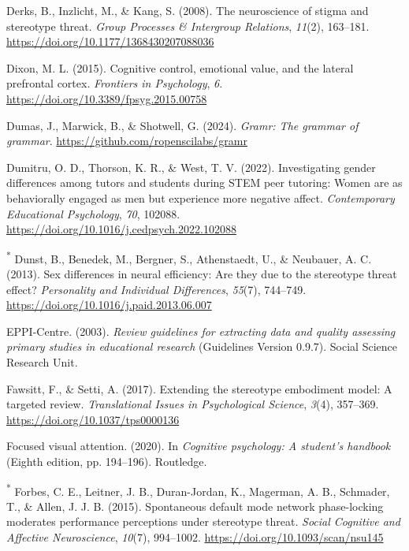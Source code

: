 \documentclass[
  stu, a4paper, 12pt,mask,floatsintext]{apa7}
\newlength{\cslhangindent}
\newenvironment{CSLReferences}[2] %
 {\begin{list}{}{%
  \setlength{\itemindent}{0pt}
  \setlength{\leftmargin}{0pt}
  \setlength{\parsep}{0pt}
  \ifodd #1
   \setlength{\leftmargin}{\cslhangindent}
   \setlength{\itemindent}{-1\cslhangindent}
  \fi
  \setlength{\itemsep}{#2\baselineskip}}}
 {\end{list}}
\begin{document}
\begin{CSLReferences}{1}{0}
Derks, B., Inzlicht, M., \& Kang, S. (2008). The neuroscience of stigma and stereotype threat. \emph{Group Processes \& Intergroup Relations}, \emph{11}(2), 163--181. \url{https://doi.org/10.1177/1368430207088036}

Dixon, M. L. (2015). Cognitive control, emotional value, and the lateral prefrontal cortex. \emph{Frontiers in Psychology}, \emph{6}. \url{https://doi.org/10.3389/fpsyg.2015.00758}

Dumas, J., Marwick, B., \& Shotwell, G. (2024). \emph{Gramr: The grammar of grammar}. \url{https://github.com/ropenscilabs/gramr}

Dumitru, O. D., Thorson, K. R., \& West, T. V. (2022). Investigating gender differences among tutors and students during {STEM} peer tutoring: {Women} are as behaviorally engaged as men but experience more negative affect. \emph{Contemporary Educational Psychology}, \emph{70}, 102088. \url{https://doi.org/10.1016/j.cedpsych.2022.102088}

\textsuperscript{*} Dunst, B., Benedek, M., Bergner, S., Athenstaedt, U., \& Neubauer, A. C. (2013). Sex differences in neural efficiency: {Are} they due to the stereotype threat effect? \emph{Personality and Individual Differences}, \emph{55}(7), 744--749. \url{https://doi.org/10.1016/j.paid.2013.06.007}

EPPI-Centre. (2003). \emph{Review guidelines for extracting data and quality assessing primary studies in educational research} (Guidelines Version 0.9.7). Social Science Research Unit.

Fawsitt, F., \& Setti, A. (2017). Extending the stereotype embodiment model: A targeted review. \emph{Translational Issues in Psychological Science}, \emph{3}(4), 357--369. \url{https://doi.org/10.1037/tps0000136}

Focused visual attention. (2020). In \emph{Cognitive psychology: A student's handbook} (Eighth edition, pp. 194--196). Routledge.

\textsuperscript{*} Forbes, C. E., Leitner, J. B., Duran-Jordan, K., Magerman, A. B., Schmader, T., \& Allen, J. J. B. (2015). Spontaneous default mode network phase-locking moderates performance perceptions under stereotype threat. \emph{Social Cognitive and Affective Neuroscience}, \emph{10}(7), 994--1002. \url{https://doi.org/10.1093/scan/nsu145}


\end{CSLReferences}
\end{document}
